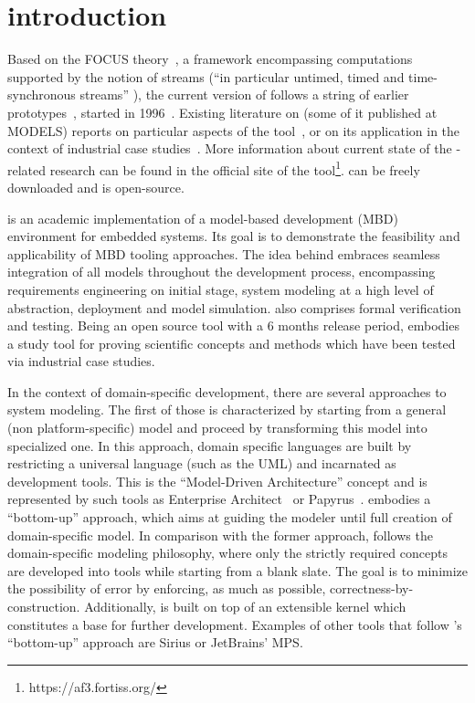 \section{introduction}

Based on the FOCUS theory~\cite{Broy:2001:SDI:374869}, a framework encompassing
computations supported by the notion of streams (“in particular untimed, timed
and time-synchronous streams” \cite{Holzl:2007:AST:1927558.1927576}),
the current version of \af follows a string of earlier
prototypes~\cite{Holzl:2007:AST:1927558.1927576,DBLP:conf/models/AravantinosVTHS15}, started in 1996~\cite{Huber96autofocus--}. Existing literature on \af
(some of it published at MODELS) reports on particular aspects of the
tool~\cite{TMR2013,TMR2011,Lucio:17,DBLP:conf/se/VossEH14,Barner2016,Diewald2016,Carlan2017}, or on its
application in the context of industrial case
studies~\cite{2009-a-top-down-methodology-for-the-development-of-automotive-software,2011KeylessEntry,Bohm:2014:FSE:2593850.2593856,DBLP:conf/models/AravantinosVTHS15,Barner2017,Eder2017}.
More information about current state of the \af-related research can be found in
the official site of the tool\footnote{ https://af3.fortiss.org/}. \af can be
freely downloaded and is open-source.

\af is an academic implementation of a model-based development (MBD)
environment for embedded systems. Its goal is to demonstrate the feasibility and applicability of
MBD tooling approaches. The idea behind \af embraces seamless integration of all models throughout the
development process, encompassing requirements engineering on initial stage, system
modeling at a high level of abstraction, deployment and model simulation. \af
also comprises formal verification and testing. Being an open source tool with a 6 months
release period, \af embodies a study tool for proving scientific concepts and
methods which have been tested via industrial case studies.

In the context of domain-specific development, there are several approaches to
system modeling. The first of those is characterized by starting from a general
(non platform-specific) model and proceed by transforming this model into
specialized one. In this approach, domain specific languages are built by
restricting a universal language (such as the UML) and incarnated as development
tools. This is the “Model-Driven Architecture” concept and is represented by
such tools as Enterprise Architect~\cite{SparxSystems} or
Papyrus~\cite{Papyrus}. \af embodies a “bottom-up” approach, which aims at
guiding the modeler until full creation of domain-specific model.
In comparison with the former approach, \af follows the domain-specific modeling
philosophy, where only the strictly required concepts are developed into tools while starting
from a blank slate. The goal is to minimize the possibility of error by
enforcing, as much as possible, correctness-by-construction. Additionally, \af
is built on top of an extensible kernel which constitutes a base for further
development. Examples of other tools that follow \af's ``bottom-up'' approach are
Sirius\cite{Sirius} or JetBrains' MPS\cite{MPS}.

